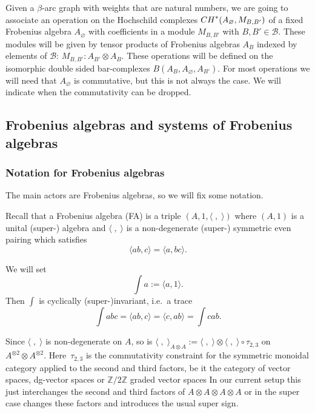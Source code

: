 \documentclass[11pt]{article}
\def\calB{{\mathcal B}}
\def\la{\langle}
\def\ra{\rangle}
\def\Z{\mathbb Z}
\begin{document}
Given a $\beta$-arc graph with weights that are natural numbers, we are going to
associate an operation on the Hochschild complexes  ${\rm CH}^*(A_{\varnothing},M_{B,B'})$
of a f\/ixed Frobenius algebra $A_{\varnothing}$ with coef\/f\/icients in a module $M_{B,B'}$ with $B,B'\in \calB$.
These modules will be given by tensor products of Frobenius algebras $A_B$ indexed by elements of $\calB$: $M_{B,B'}: A_{B'}\otimes A_B$. These operations will be def\/ined on the isomorphic
double sided bar-complexes  $B(A_B,A_{\varnothing},A_{B'})$. For most operations we will need
that $A_{\varnothing}$ is commutative, but this is not always the case.  We will indicate
when the commutativity can be dropped.


\subsection{Frobenius algebras and systems of Frobenius algebras}

\subsubsection{Notation for Frobenius algebras}
The main actors are  Frobenius algebras, so we will f\/ix some notation.

Recall that a Frobenius algebra (FA) is a triple $(A,1, \langle \; ,\;\rangle)$
where $(A,1)$ is a unital (super-) algebra and $\langle \; ,\;\rangle$ is a non-degenerate
(super-) symmetric even pairing which satisf\/ies
\begin{equation*}
\langle ab,c\rangle=\langle a,bc\rangle.
\end{equation*}

We will set
\begin{equation*}
\int a :=\langle a , 1 \rangle.
\end{equation*}
Then $\int$ is cyclically (super-)invariant, i.e.\ a trace
\begin{equation*}
\int abc = \la ab,c\ra =\la c, ab\ra=\int cab.
\end{equation*}


Since $ \langle \; ,\;\rangle$ is non-degenerate on $A$, so is $
\langle \; ,\;\rangle_{A\otimes A}:=\langle \; ,\;\rangle\otimes
\langle \; ,\;\rangle\circ \tau_{2,3}$ on $A^{\otimes 2}\otimes
A^{\otimes 2}$. Here~$\tau_{2,3}$ is the commutativity constraint
for the symmetric monoidal category applied to the second and third
factors, be it the category of vector spaces, dg-vector spaces or
$\Z/2\Z$ graded vector spaces
 In our current setup this just interchanges the second and third  factors of
$A\otimes A\otimes A\otimes A$  or in the super case changes these factors and introduces
the usual super sign.
\end{document}

